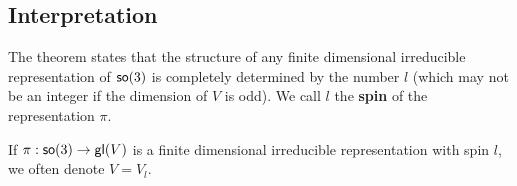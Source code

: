 \subsection{Interpretation}
The theorem states that the structure of any finite dimensional irreducible representation of $\operatorname{\textsf{so}}(3)$ is completely determined by the number $l$ (which may not be an integer if the dimension of $V$ is odd). We call $l$ the \textbf{spin} of the representation $\pi$. 

If $\pi: \operatorname{\textsf{so}}(3) \rightarrow \operatorname{\textsf{gl}}(V)$ is a finite dimensional irreducible representation with spin $l$, we often denote $V = V_l$.

